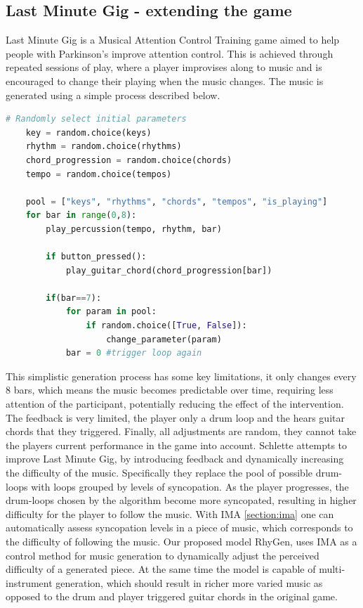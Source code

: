 \subsection{Last Minute Gig - extending the game} \label{section:gameext}
Last Minute Gig \cite{Chalkiadakis_2022} is a Musical Attention Control Training game aimed to help people with Parkinson's improve attention control. This is achieved through repeated sessions of play, where a player improvises along to music and is encouraged to change their playing when the music changes. The music is generated using a simple process described below.

\begin{lstlisting}[language=Python]
    # Randomly select initial parameters
    key = random.choice(keys)
    rhythm = random.choice(rhythms)
    chord_progression = random.choice(chords)
    tempo = random.choice(tempos)
    
    pool = ["keys", "rhythms", "chords", "tempos", "is_playing"]
    for bar in range(0,8):
        play_percussion(tempo, rhythm, bar)
        
        if button_pressed():
            play_guitar_chord(chord_progression[bar])
        
        if(bar==7):
            for param in pool: 
                if random.choice([True, False]):
                    change_parameter(param)
            bar = 0 #trigger loop again
    \end{lstlisting}
    
This simplistic generation process has some key limitations, it only changes every 8 bars, which means the music becomes predictable over time, requiring less attention of the participant, potentially reducing the effect of the intervention. The feedback is very limited, the player only a drum loop and the hears guitar chords that they triggered. Finally, all adjustments are random, they cannot take the players current performance in the game into account. Schlette \cite{Schlette_2022} attempts to improve Last Minute Gig, by introducing feedback and dynamically increasing the difficulty of the music. Specifically they replace the pool of possible drum-loops with loops grouped by levels of syncopation. As the player progresses, the drum-loops chosen by the algorithm become more syncopated, resulting in higher difficulty for the player to follow the music. With IMA \ref{section:ima} one can automatically assess syncopation levels in a piece of music, which corresponds to the difficulty of following the music. Our proposed model RhyGen, uses IMA as a control method for music generation to dynamically adjust the perceived difficulty of a generated piece. At the same time the model is capable of multi-instrument generation, which should result in richer more varied music as opposed to the drum and player triggered guitar chords in the original game.

